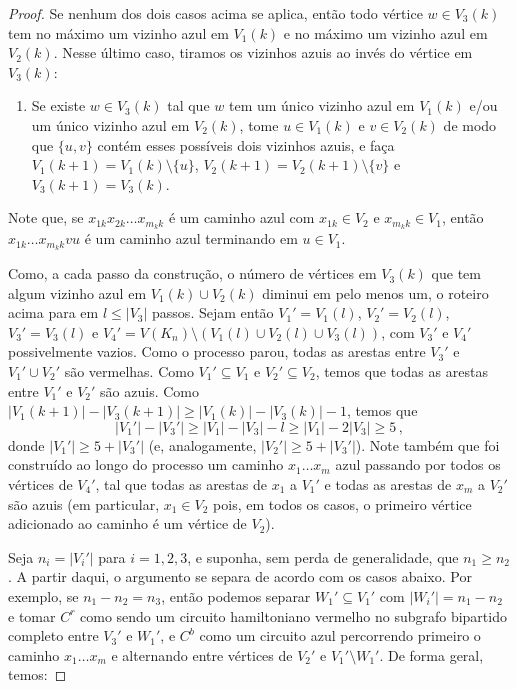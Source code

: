 \begin{proof}
	Se nenhum dos dois casos acima se aplica, então todo vértice $w\in V_3(k)$ tem no máximo um vizinho azul em $V_1(k)$ e no máximo um vizinho azul em $V_2(k)$. Nesse último caso, tiramos os vizinhos azuis ao invés do vértice em $V_3(k)$:
	\begin{enumerate}
		\item Se existe $w\in V_3(k)$ tal que $w$ tem um único vizinho azul em $V_1(k)$ e/ou um único vizinho azul em $V_2(k)$, tome $u\in V_1(k)$ e $v\in V_2(k)$ de modo que $\{u,v\}$ contém esses possíveis dois vizinhos azuis, e faça $V_1(k+1) = V_1(k)\setminus\{u\}$, $V_2(k+1) = V_2(k+1)\setminus\{v\}$ e $V_3(k+1) = V_3(k)$.
	\end{enumerate}
	Note que, se $x_{1k}x_{2k}\dots x_{m_kk}$ é um caminho azul com $x_{1k}\in V_2$ e $x_{m_kk}\in V_1$, então $x_{1k}\dots x_{m_kk}vu$ é um caminho azul terminando em $u\in V_1$.
	
	Como, a cada passo da construção, o número de vértices em $V_3(k)$ que tem algum vizinho azul em $V_1(k)\cup V_2(k)$ diminui em pelo menos um, o roteiro acima para em $l\leq |V_3|$ passos. Sejam então $V_1' = V_1(l)$, $V_2' = V_2(l)$, $V_3' = V_3(l)$ e $V_4' = V(K_n)\setminus (V_1(l)\cup V_2(l)\cup V_3(l))$, com $V_3'$ e $V_4'$ possivelmente vazios. Como o processo parou, todas as arestas entre $V_3'$ e $V_1'\cup V_2'$ são vermelhas. Como $V_1'\subseteq V_1$ e $V_2'\subseteq V_2$, temos que todas as arestas entre $V_1'$ e $V_2'$ são azuis. Como $|V_1(k+1)| - |V_3(k+1)|\geq |V_1(k)| - |V_3(k)| - 1$, temos que 
	\[
		|V_1'| - |V_3'| \geq |V_1| - |V_3| - l \geq |V_1| - 2|V_3| \geq 5\,,
	\]
	donde $|V_1'|\geq 5 + |V_3'|$ (e, analogamente, $|V_2'|\geq 5 + |V_3'|$). Note também que foi construído ao longo do processo um caminho $x_1\dots x_m$ azul passando por todos os vértices de $V_4'$, tal que todas as arestas de $x_1$ a $V_1'$ e todas as arestas de $x_m$ a $V_2'$ são azuis (em particular, $x_1\in V_2$ pois, em todos os casos, o primeiro vértice adicionado ao caminho é um vértice de $V_2$).
	
	Seja $n_i = |V_i'|$ para $i=1,2,3$, e suponha, sem perda de generalidade, que $n_1\geq n_2$. A partir daqui, o argumento se separa de acordo com os casos abaixo. Por exemplo, se $n_1-n_2 = n_3$, então podemos separar $W_1'\subseteq V_1'$ com $|W_i'| = n_1-n_2$ e tomar $C^r$ como sendo um circuito hamiltoniano vermelho no subgrafo bipartido completo entre $V_3'$ e $W_1'$, e $C^b$ como um circuito azul percorrendo primeiro o caminho $x_1\dots x_m$ e alternando entre vértices de $V_2'$ e $V_1'\setminus W_1'$. De forma geral, temos:
	

\end{proof}

